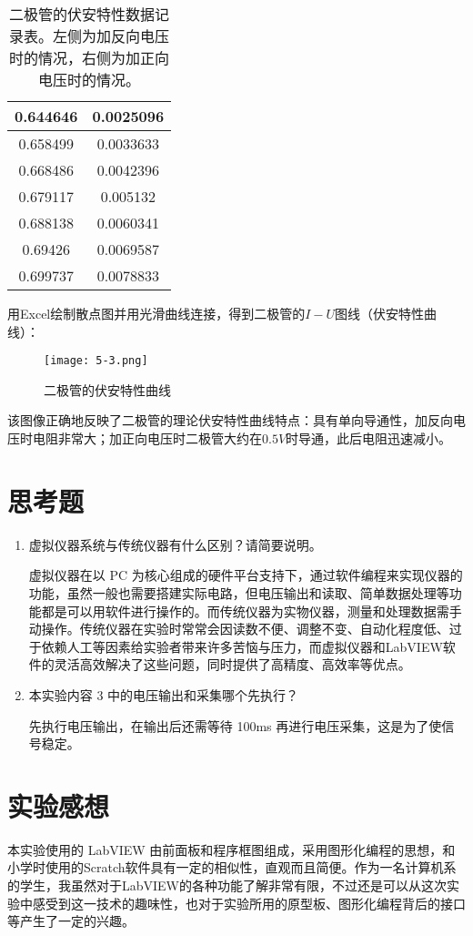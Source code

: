 \documentclass[12pt]{article}
\begin{document}
\begin{table}[htbp]
\begin{tabular}{|c|c|}
        \hline
        0.644646 & 0.0025096 \\
        \hline
        0.658499 & 0.0033633 \\
        \hline
        0.668486 & 0.0042396 \\
        \hline
        0.679117 & 0.005132 \\
        \hline
        0.688138 & 0.0060341 \\
        \hline
        0.69426 & 0.0069587 \\
        \hline
        0.699737 & 0.0078833 \\
        \hline
    \end{tabular}%
    \caption{二极管的伏安特性数据记录表。左侧为加反向电压时的情况，右侧为加正向电压时的情况。}
\end{table}%

用Excel绘制散点图并用光滑曲线连接，得到二极管的$I-U$图线（伏安特性曲线）：

\begin{figure}[h!]
    \centering
    \texttt{[image: 5-3.png]}
    \caption{二极管的伏安特性曲线}
\end{figure}

该图像正确地反映了二极管的理论伏安特性曲线特点：具有单向导通性，加反向电压时电阻非常大；加正向电压时二极管大约在$0.5V$时导通，此后电阻迅速减小。

\section{思考题}
\begin{enumerate}
    \item 虚拟仪器系统与传统仪器有什么区别？请简要说明。
    
    {\kaishu 虚拟仪器在以 PC 为核心组成的硬件平台支持下，通过软件编程来实现仪器的功能，虽然一般也需要搭建实际电路，但电压输出和读取、简单数据处理等功能都是可以用软件进行操作的。而传统仪器为实物仪器，测量和处理数据需手动操作。传统仪器在实验时常常会因读数不便、调整不变、自动化程度低、过于依赖人工等因素给实验者带来许多苦恼与压力，而虚拟仪器和LabVIEW软件的灵活高效解决了这些问题，同时提供了高精度、高效率等优点。}
    \item 本实验内容 3 中的电压输出和采集哪个先执行？
    
    {\kaishu 先执行电压输出，在输出后还需等待 100ms 再进行电压采集，这是为了使信号稳定。}
\end{enumerate}

\section{实验感想}
本实验使用的 LabVIEW 由前面板和程序框图组成，采用图形化编程的思想，和小学时使用的Scratch软件具有一定的相似性，直观而且简便。作为一名计算机系的学生，我虽然对于LabVIEW的各种功能了解非常有限，不过还是可以从这次实验中感受到这一技术的趣味性，也对于实验所用的原型板、图形化编程背后的接口等产生了一定的兴趣。
\end{document}
